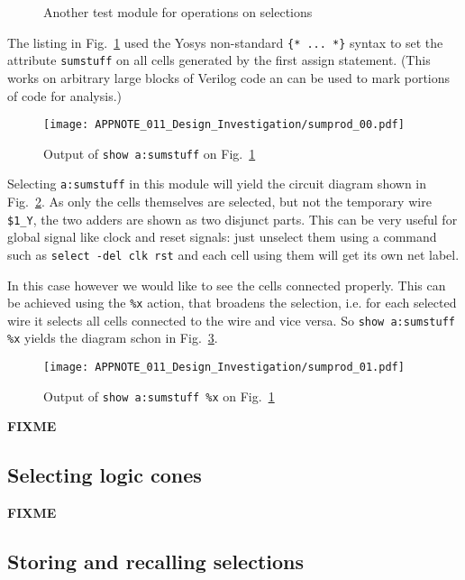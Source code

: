 \documentclass[9pt,technote,a4paper]{IEEEtran}
\def\FIXME{{\color{red}\bf FIXME}}
\begin{document}
\begin{figure}[t]

\caption{Another test module for operations on selections}
\label{sumprod}
\end{figure}

The listing in Fig.~\ref{sumprod} used the Yosys non-standard {\tt \{* ... *\}}
syntax to set the attribute {\tt sumstuff} on all cells generated by the first
assign statement. (This works on arbitrary large blocks of Verilog code an
can be used to mark portions of code for analysis.)

\begin{figure}[b]
\texttt{[image: APPNOTE\_011\_Design\_Investigation/sumprod\_00.pdf]}
\caption{Output of {\tt show a:sumstuff} on Fig.~\ref{sumprod}}
\label{sumprod_00}
\end{figure}

Selecting {\tt a:sumstuff} in this module will yield the circuit diagram shown
in Fig.~\ref{sumprod_00}. As only the cells themselves are selected, but not
the temporary wire {\tt \$1\_Y}, the two adders are shown as two disjunct
parts. This can be very useful for global signal like clock and reset signals: just
unselect them using a command such as {\tt select -del clk rst} and each cell
using them will get its own net label.

In this case however we would like to see the cells connected properly. This
can be achieved using the {\tt \%x} action, that broadens the selection, i.e.
for each selected wire it selects all cells connected to the wire and vice
versa. So {\tt show a:sumstuff \%x} yields the diagram schon in Fig.~\ref{sumprod_01}.

\begin{figure}[t]
\texttt{[image: APPNOTE\_011\_Design\_Investigation/sumprod\_01.pdf]}
\caption{Output of {\tt show a:sumstuff \%x} on Fig.~\ref{sumprod}}
\label{sumprod_01}
\end{figure}

\FIXME{}

\subsection{Selecting logic cones}

\FIXME{}

\subsection{Storing and recalling selections}
\end{document}
